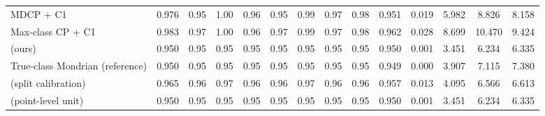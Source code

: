 \begin{table}[!htbp]
{\begin{tabular}{lccccccccccccc}
MDCP + C1 & 0.976 & 0.95 & 1.00 & 0.96 & 0.95 & 0.99 & 0.97 & 0.98 & 0.951 & 0.019 & 5.982 & 8.826 & 8.158 \\
Max-class CP + C1 & 0.983 & 0.97 & 1.00 & 0.96 & 0.97 & 0.99 & 0.97 & 0.98 & 0.962 & 0.028 & 8.699 & 10.470 & 9.424 \\
\gamut{} (ours) & 0.950 & 0.95 & 0.95 & 0.95 & 0.95 & 0.95 & 0.95 & 0.95 & 0.950 & 0.001 & 3.451 & 6.234 & 6.335 \\
True-class Mondrian (reference) & 0.950 & 0.95 & 0.95 & 0.95 & 0.95 & 0.95 & 0.95 & 0.95 & 0.949 & 0.000 & 3.907 & 7.115 & 7.380 \\
\gamut{} (split calibration) & 0.965 & 0.96 & 0.97 & 0.96 & 0.96 & 0.97 & 0.96 & 0.96 & 0.957 & 0.013 & 4.095 & 6.566 & 6.613 \\
\gamut{} (point-level unit) & 0.950 & 0.95 & 0.95 & 0.95 & 0.95 & 0.95 & 0.95 & 0.95 & 0.950 & 0.001 & 3.451 & 6.234 & 6.335 \\
\bottomrule
\end{tabular}}
\end{table}
\FloatBarrier
